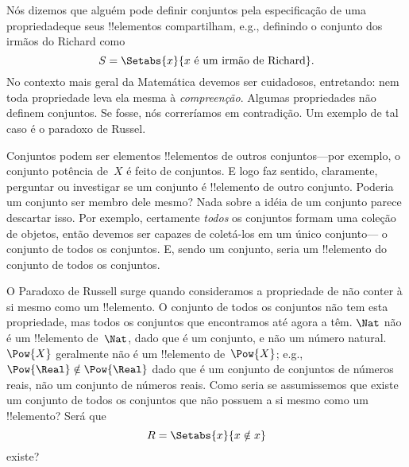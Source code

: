 \documentclass[../../../include/open-logic-section]{subfiles}
\begin{document}

Nós dizemos que alguém pode definir conjuntos pela especificação de uma propriedadeque seus !!{elemento}s compartilham, e.g., definindo o conjunto dos irmãos do Richard como
\[
S = \Setabs{x}{x \text{ é um irmão de Richard}}.
\]
No contexto mais geral da Matemática devemos ser cuidadosos, entretando:
nem toda propriedade leva ela mesma à \emph{compreenção}. Algumas propriedades não definem conjuntos. Se fosse, nós correríamos em contradição. Um exemplo de tal caso é o paradoxo de Russel.


Conjuntos podem ser elementos !!{elemento}s de outros conjuntos---por 
exemplo, o conjunto potência de~$X$ é feito de conjuntos. E logo faz 
sentido, claramente, perguntar ou investigar se um conjunto é !!{elemento}
de outro conjunto. Poderia um conjunto ser membro dele mesmo? 
Nada sobre a idéia de um conjunto parece descartar isso. Por exemplo, 
certamente \emph{todos} os conjuntos formam uma coleção de objetos, então 
devemos ser capazes de coletá-los em um único conjunto--- o conjunto de 
todos os conjuntos. E, sendo um conjunto, seria um !!{elemento} do 
conjunto de todos os conjuntos.


O Paradoxo de Russell surge quando consideramos a propriedade de não conter à si mesmo como um !!{elemento}. O conjunto de todos os conjuntos não tem esta propriedade, mas todos os conjuntos que encontramos até agora a têm. $\Nat$ não é um !!{elemento} de~$\Nat$, dado que é um conjunto, e não um número natural. $\Pow{X}$ geralmente não é um !!{elemento} de~$\Pow{X}$; e.g.,
$\Pow{\Real} \notin \Pow{\Real}$ dado que é um conjunto de conjuntos de números reais, não um conjunto de números reais.
Como seria se assumissemos que existe um conjunto de todos os conjuntos
que não possuem a si mesmo como um !!{elemento}? Será que
\[
R = \Setabs{x}{x \notin x}
\]
existe?
\end{document}
